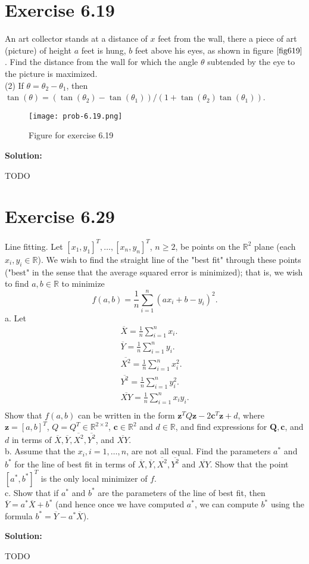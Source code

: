 \documentclass{article}
\newcommand{\bld}[1]{\boldsymbol{#1}}
\begin{document}
\section*{Exercise 6.19}
An art collector stands at a distance of $x$ feet from the wall, there a piece
of art (picture) of height $a$ feet is hung, $b$ feet above his eyes, as shown
in figure $\ref{fig619}$. Find the distance from the wall for which the angle $\theta$
subtended by the eye to the picture is maximized.\\
(2) If $\theta = \theta_2 - \theta_1$, then
$\tan(\theta)=(\tan(\theta_2)-\tan(\theta_1))/(1+\tan(\theta_2)\tan(\theta_1))$.
\begin{figure}[ht]
	\center
	\caption{Figure for exercise 6.19}
	\texttt{[image: prob-6.19.png]}
	\label{fig619}
\end{figure}

\textbf{Solution:}

TODO
\section*{Exercise 6.29}
Line fitting. Let $[x_1,y_1]^T,\dots,[x_n,y_n]^T$, $n\geq 2$, be points on the
$\mathbb{R}^2$ plane (each $x_i,y_i\in \mathbb{R}$). We wish to find the
straight line of the "best fit" through these points ("best" in the sense that
the average squared error is minimized); that is, we wish to find $a,b\in
\mathbb{R}$ to minimize
\[
	f(a,b)=\frac{1}{n} \sum_{i=1}^n(ax_i+b-y_i)^2.
\]
a. Let
\begin{align*}
	\overline{X}=\frac{1}{n}\sum_{i=1}^n x_i.\\
	\overline{Y}=\frac{1}{n}\sum_{i=1}^n y_i.\\
	\overline{X^2}=\frac{1}{n}\sum_{i=1}^n x_i^2.\\
	\overline{Y^2}=\frac{1}{n}\sum_{i=1}^n y_i^2.\\
	\overline{XY}=\frac{1}{n}\sum_{i=1}^n x_iy_i.\\
\end{align*}
Show that $f(a,b)$ can be written in the form $\bld{z}^TQ\bld{z} -
2\bld{c}^T\bld{z} + d$, where $\bld{z}=[a,b]^T$, $Q=Q^T\in \mathbb{R}^{2\times
2}$, $\bld{c}\in \mathbb{R}^2$ and $d\in\mathbb{R}$, and find expressions for
$\bld{Q},\bld{c}$, and $d$ in terms of $\overline{X}, \overline{Y},
\overline{X^2}, \overline{Y^2}$, and $\overline{XY}$.\\
b. Assume that the $x_i, i=1,\dots,n$, are not all equal. Find the parameters
$a^*$ and $b^*$ for the line of best fit in terms of
$\overline{X},\overline{Y},\overline{X^2},\overline{Y^2}$ and $\overline{XY}$.
Show that the point $[a^*,b^*]^T$ is the only local minimizer of $f$.\\
c. Show that if $a^*$ and $b^*$ are the parameters of the line of best fit,
then $\overline{Y}=a^*\overline{X}+b^*$ (and hence once we have computed $a^*$,
we can compute $b^*$ using the formula $b^*=\overline{Y}-a^*\overline{X}$).

\textbf{Solution:}

TODO
\end{document}
